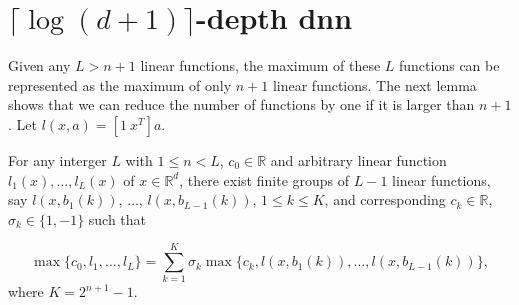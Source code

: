\section{$\lceil \log(d+1)\rceil$-depth dnn}
Given any $L>n+1$ linear functions, the maximum of these $L$ functions can be represented as the maximum of only $n+1$ linear functions. The next lemma shows that we can reduce the number of functions by one if it is larger than $n+1$. 
Let $l(x,a)=[1\ x^T]a$.
\begin{lemma}\label{reduce}
	For any interger $L$ with $1\le n< L$, $c_0\in\mathbb{R}$ and arbitrary linear function $l_1(x),\dots,l_L(x)$ of $x\in\mathbb{R}^d$, there exist finite groups of $L-1$ linear functions, say $l(x,b_1(k))$, $\dots$,
	$l(x,b_{L-1}(k))$, $1\le k\le K$, and corresponding $c_k\in\mathbb{R}$, $\sigma_k\in\{1,-1\}$ such that
	
	\begin{equation}\label{goal}
	\max\{c_0,l_1,\dots,l_L\} = \sum_{k=1}^{K}\sigma_k\max\{c_k,l(x,b_1(k)),\dots,l(x,b_{L-1}(k))\},
	\end{equation}
	where $K=2^{n+1}-1$.
\end{lemma}

